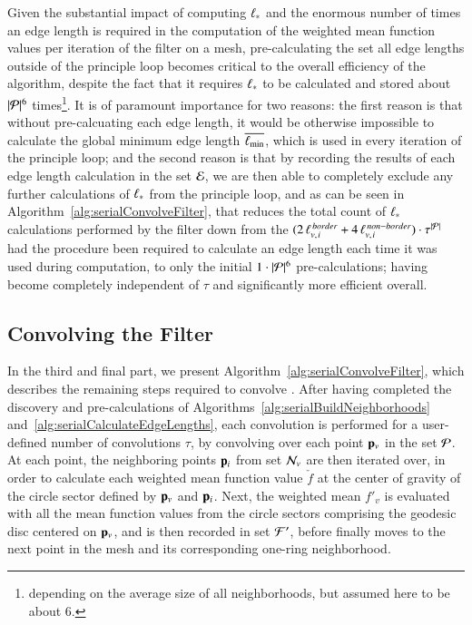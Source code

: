 Given the substantial impact of computing ${\ell_\ast}$ and the enormous number of times an edge length is required in the computation of the weighted mean function values per iteration of the filter on a mesh, pre-calculating the set all edge lengths outside of the principle loop becomes critical to the overall efficiency of the algorithm, despite the fact that it requires ${\ell_\ast}$ to be calculated and stored about $|\mathcal{P}|^6$ times\footnote{depending on the average size of all neighborhoods, but assumed here to be about 6.}. It is of paramount importance for two reasons: the first reason is that without pre-calcuating each edge length, it would be otherwise impossible to calculate the global minimum  edge length $\overline{\ell_\text{min}}$, which is used in every iteration of the principle loop; and the second reason is that by recording the results of each edge length calculation in the set $\mathcal{E}$, we are then able to completely exclude any further calculations of $\ell_\ast$ from the principle loop, and as can be seen in Algorithm~\ref{alg:serialConvolveFilter}, that reduces the total count of $\ell_\ast$ calculations performed by the filter down from the $(2\,\ell_{v,\kern.75pt i}^{\,border} + 4\,\ell_{v,\kern.75pt i}^{\,non-border})\cdot\tau^{|\mathcal{P}|}$ had the procedure been required to calculate an edge length each time it was used during computation, to only the initial $1\cdot |\mathcal{P}|^6$ pre-calculations; having become completely independent of $\tau$ and significantly more efficient overall.%
%

%
%
%
%
\subsection{Convolving the Filter}
\label{ch5sCF}
In the third and final part, we present Algorithm~\ref{alg:serialConvolveFilter}, which describes the remaining steps required to convolve . After having completed the discovery and pre-calculations of Algorithms~\ref{alg:serialBuildNeighborhoods} and~\ref{alg:serialCalculateEdgeLengths}, each convolution is performed for a user-defined number of convolutions $\tau$, by convolving over each point $\mathbf{p}_v$ in the set $\mathcal{P}$. At each point, the neighboring points $\mathbf{p}_i$ from set $\mathcal{N}_v$ are then iterated over, in order to calculate each weighted mean function value $\check{f}$ at the center of gravity of the circle sector defined by $\mathbf{p}_v$ and $\mathbf{p}_i$. Next, the weighted mean $f'_v$ is evaluated with all the mean function values from the circle sectors comprising the geodesic disc centered on $\mathbf{p}_v$,  and is then recorded in set $\mathcal{F}'$, before  finally moves to the next point in the mesh and its corresponding one-ring neighborhood.

